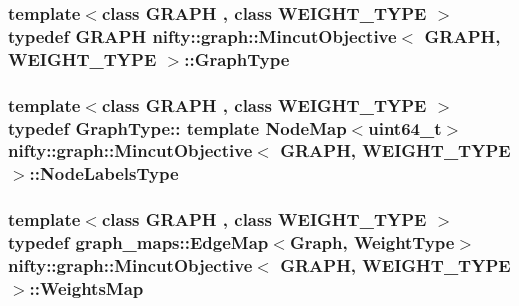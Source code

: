 \subsubsection[{Graph\+Type}]{\setlength{\rightskip}{0pt plus 5cm}template$<$class G\+R\+A\+P\+H , class W\+E\+I\+G\+H\+T\+\_\+\+T\+Y\+P\+E $>$ typedef G\+R\+A\+P\+H {\bf nifty\+::graph\+::\+Mincut\+Objective}$<$ G\+R\+A\+P\+H, W\+E\+I\+G\+H\+T\+\_\+\+T\+Y\+P\+E $>$\+::{\bf Graph\+Type}}\label{classnifty_1_1graph_1_1MincutObjective_ae2da9f8bbdb2d5e7c283b70c78f463c4}
\hypertarget{classnifty_1_1graph_1_1MincutObjective_a9fb391e13a45b36d341390046c5ea1ac}{}
\subsubsection[{Node\+Labels\+Type}]{\setlength{\rightskip}{0pt plus 5cm}template$<$class G\+R\+A\+P\+H , class W\+E\+I\+G\+H\+T\+\_\+\+T\+Y\+P\+E $>$ typedef Graph\+Type\+:: template Node\+Map$<$uint64\+\_\+t$>$ {\bf nifty\+::graph\+::\+Mincut\+Objective}$<$ G\+R\+A\+P\+H, W\+E\+I\+G\+H\+T\+\_\+\+T\+Y\+P\+E $>$\+::{\bf Node\+Labels\+Type}}\label{classnifty_1_1graph_1_1MincutObjective_a9fb391e13a45b36d341390046c5ea1ac}
\hypertarget{classnifty_1_1graph_1_1MincutObjective_a68accda695f950a00c01c83d3028ccdb}{}
\subsubsection[{Weights\+Map}]{\setlength{\rightskip}{0pt plus 5cm}template$<$class G\+R\+A\+P\+H , class W\+E\+I\+G\+H\+T\+\_\+\+T\+Y\+P\+E $>$ typedef {\bf graph\+\_\+maps\+::\+Edge\+Map}$<${\bf Graph}, {\bf Weight\+Type}$>$ {\bf nifty\+::graph\+::\+Mincut\+Objective}$<$ G\+R\+A\+P\+H, W\+E\+I\+G\+H\+T\+\_\+\+T\+Y\+P\+E $>$\+::{\bf Weights\+Map}}\label{classnifty_1_1graph_1_1MincutObjective_a68accda695f950a00c01c83d3028ccdb}
\hypertarget{classnifty_1_1graph_1_1MincutObjective_aeaa856aa2ca34a2d3b3f3e9e250fd831}{}
